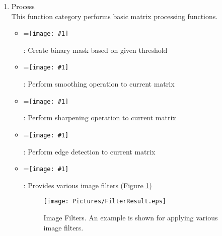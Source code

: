 \documentclass{book}%
\newcommand{\vcenteredinclude}[1]{
\begingroup
\setbox0=\hbox{\texttt{[image: \#1]}}
\parbox{\wd0}{\box0}\endgroup}
\begin{document}
\begin{enumerate}
	\begin{itemize}
		\item \vcenteredinclude{Pictures/FlipLR.eps} : Flip matrix horizontally (along the first dimension)
		\item \vcenteredinclude{Pictures/FlipUD.eps} : Flip matrix vertically (along the second dimension)
		\item \vcenteredinclude{Pictures/FlipZ.eps} : Flip matrix along slice direction (the third dimension)
		\item \vcenteredinclude{Pictures/Rot90L.eps} : Rotate matrix 90 degree in the counter clockwise direction
		\item \vcenteredinclude{Pictures/Rot90R.eps} : Rotate matrix 90 degree in the clockwise direction
		\item \vcenteredinclude{Pictures/Rotate.eps} : Rotate matrix certain degree along an axis specified using the rotation axis origin and direction in the 3D space
		\item \vcenteredinclude{Pictures/Translate.eps} : Translate matrix along certain direction
		\item \vcenteredinclude{Pictures/FFT.eps} : Perform multi-dimensional FFT for current matrix, the user needs to specify up to which dimension to perform FFT.
	\end{itemize}
	
	\item Process \\
	
	This function category performs basic matrix processing functions.
	
	\begin{itemize}
		\item \vcenteredinclude{Pictures/Mask.eps} : Create binary mask based on given threshold
		\item \vcenteredinclude{Pictures/Smooth.eps} : Perform smoothing operation to current matrix
		\item \vcenteredinclude{Pictures/Sharpen.eps} : Perform sharpening operation to current matrix
		\item \vcenteredinclude{Pictures/Edge.eps} : Perform edge detection to current matrix
		\item \vcenteredinclude{Pictures/Filter.eps} : Provides various image filters (Figure \ref{fig:FilterResult})
	
	\begin{figure}[htbp]
		\centering
			\texttt{[image: Pictures/FilterResult.eps]}
		\caption{Image Filters. An example is shown for applying various image filters.}
		\label{fig:FilterResult}
	\end{figure}
		

\end{itemize}
\end{enumerate}
\end{document}
